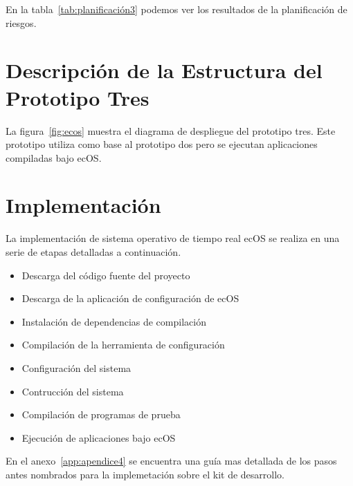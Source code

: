 En la tabla~\ref{tab:planificación3} podemos ver los resultados de la planificación de riesgos.

\section{Descripción de la Estructura del Prototipo Tres}
		La figura~\ref{fig:ecos} muestra el diagrama de despliegue del prototipo tres. Este prototipo utiliza como base al prototipo dos pero se ejecutan 
		aplicaciones compiladas bajo ecOS.

\section{Implementación}	
		
		La implementación de sistema operativo de tiempo real ecOS se realiza en una serie de etapas detalladas a continuación. 
		\begin {itemize}
		\item Descarga del código fuente del proyecto
		\item Descarga de la aplicación de configuración de ecOS
		\item Instalación de dependencias de compilación
		\item Compilación de la herramienta de configuración
		\item Configuración del sistema
		\item Contrucción del sistema 
		\item Compilación de programas de prueba
		\item Ejecución de aplicaciones bajo ecOS
 		\end {itemize}
En el anexo~\ref{app:apendice4} se encuentra una guía mas detallada de los pasos antes nombrados para la implemetación sobre el kit de desarrollo.


